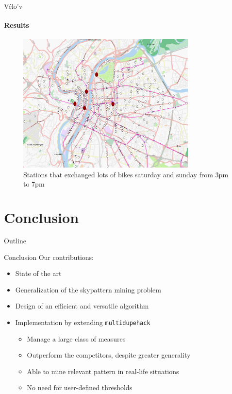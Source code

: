 \documentclass{beamer}
\newcommand{\mdh}{\texttt{multi\-dupe\-hack}}
\begin{document}
\begin{frame}{Vélo'v}
  \framesubtitle{Results}
  \begin{figure}[htp]
  \centering
  \includegraphics[width=0.8\textwidth]{pattern-weekend.png}
  \caption{Stations that exchanged lots of bikes saturday and sunday from 3pm to 7pm}
  \end{figure}
\end{frame}


\section{Conclusion}
\begin{frame}{Outline}
  \tableofcontents[currentsection]
\end{frame}

\begin{frame}{Conclusion}
  Our contributions:
  \begin{itemize}
  \item State of the art
  \item Generalization of the skypattern mining problem
  \item Design of an efficient and versatile algorithm
  \item Implementation by extending \mdh{}
    \begin{itemize}
    \item Manage a large class of measures
    \item Outperform the competitors, despite greater generality
    \item Able to mine relevant pattern in real-life situations
    \item No need for user-defined thresholds
    \end{itemize}
  \end{itemize}
\end{frame}
\end{document}
